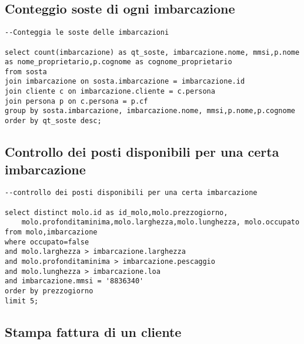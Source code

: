 \subsection{Conteggio soste di ogni imbarcazione}

\begin{lstlisting}
--Conteggia le soste delle imbarcazioni

select count(imbarcazione) as qt_soste, imbarcazione.nome, mmsi,p.nome as nome_proprietario,p.cognome as cognome_proprietario
from sosta
join imbarcazione on sosta.imbarcazione = imbarcazione.id
join cliente c on imbarcazione.cliente = c.persona
join persona p on c.persona = p.cf
group by sosta.imbarcazione, imbarcazione.nome, mmsi,p.nome,p.cognome
order by qt_soste desc;
\end{lstlisting}

\subsection{Controllo dei posti disponibili per una certa imbarcazione}
\begin{lstlisting}
--controllo dei posti disponibili per una certa imbarcazione

select distinct molo.id as id_molo,molo.prezzogiorno,
    molo.profonditaminima,molo.larghezza,molo.lunghezza, molo.occupato
from molo,imbarcazione
where occupato=false
and molo.larghezza > imbarcazione.larghezza
and molo.profonditaminima > imbarcazione.pescaggio
and molo.lunghezza > imbarcazione.loa
and imbarcazione.mmsi = '8836340'
order by prezzogiorno
limit 5;
\end{lstlisting}

\subsection{Stampa fattura di un cliente}

